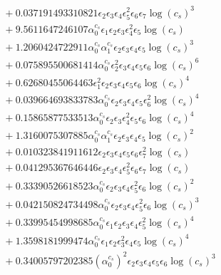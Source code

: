 \documentclass[10pt]{article}
\begin{document}
\begin{align*}
&{}  + 0.037191493310821 \epsilon_{2} \epsilon_{3} \epsilon_{4} \epsilon_{5}^{2} \epsilon_{6} \epsilon_{7} \log{\left(c_{s} \right)}^{3} \\
&{}  + 9.5611647246107 \alpha_{0}^{c_s} \epsilon_{1} \epsilon_{2} \epsilon_{3} \epsilon_{4}^{2} \epsilon_{5} \log{\left(c_{s} \right)} \\
&{}  + 1.2060424722911 \alpha_{0}^{c_s} \alpha_{1}^{c_s} \epsilon_{2} \epsilon_{3} \epsilon_{4} \epsilon_{5} \log{\left(c_{s} \right)}^{3} \\
&{}  + 0.075895500681414 \alpha_{0}^{c_s} \epsilon_{2}^{2} \epsilon_{3} \epsilon_{4} \epsilon_{5} \epsilon_{6} \log{\left(c_{s} \right)}^{6} \\
&{}  + 0.62680455064463 \epsilon_{1}^{2} \epsilon_{2} \epsilon_{3} \epsilon_{4} \epsilon_{5} \epsilon_{6} \log{\left(c_{s} \right)}^{4} \\
&{}  + 0.039664693833783 \alpha_{0}^{c_s} \epsilon_{2} \epsilon_{3} \epsilon_{4} \epsilon_{5} \epsilon_{6}^{2} \log{\left(c_{s} \right)}^{4} \\
&{}  + 0.15865877533513 \alpha_{0}^{c_s} \epsilon_{2} \epsilon_{3} \epsilon_{4}^{2} \epsilon_{5} \epsilon_{6} \log{\left(c_{s} \right)}^{4} \\
&{}  + 1.3160075307885 \alpha_{0}^{c_s} \alpha_{1}^{c_s} \epsilon_{2} \epsilon_{3} \epsilon_{4} \epsilon_{5} \log{\left(c_{s} \right)}^{2} \\
&{}  + 0.010323841911612 \epsilon_{2} \epsilon_{3} \epsilon_{4} \epsilon_{5} \epsilon_{6} \epsilon_{7}^{2} \log{\left(c_{s} \right)} \\
&{}  + 0.041295367646446 \epsilon_{2} \epsilon_{3} \epsilon_{4} \epsilon_{5}^{2} \epsilon_{6} \epsilon_{7} \log{\left(c_{s} \right)} \\
&{}  + 0.33390526618523 \alpha_{0}^{c_s} \epsilon_{2} \epsilon_{3} \epsilon_{4} \epsilon_{5}^{2} \epsilon_{6} \log{\left(c_{s} \right)}^{2} \\
&{}  + 0.042150824734498 \alpha_{0}^{c_s} \epsilon_{2} \epsilon_{3} \epsilon_{4} \epsilon_{5}^{2} \epsilon_{6} \log{\left(c_{s} \right)}^{3} \\
&{}  + 0.33995454998685 \alpha_{0}^{c_s} \epsilon_{1} \epsilon_{2} \epsilon_{3} \epsilon_{4} \epsilon_{5}^{2} \log{\left(c_{s} \right)}^{4} \\
&{}  + 1.3598181999474 \alpha_{0}^{c_s} \epsilon_{1} \epsilon_{2} \epsilon_{3}^{2} \epsilon_{4} \epsilon_{5} \log{\left(c_{s} \right)}^{4} \\
&{}  + 0.34005797202385 \left(\alpha_{0}^{c_s}\right)^{2} \epsilon_{2} \epsilon_{3} \epsilon_{4} \epsilon_{5} \epsilon_{6} \log{\left(c_{s} \right)}^{3} \\

\end{align*}
\end{document}
